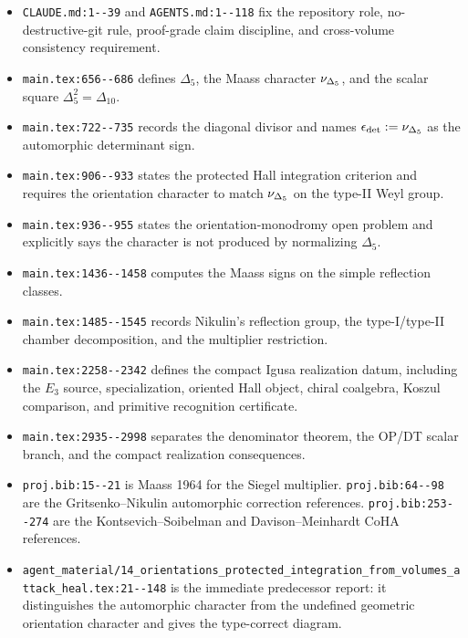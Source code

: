 \begin{itemize}
\item \verb|CLAUDE.md:1--39| and \verb|AGENTS.md:1--118| fix the
repository role, no-destructive-git rule, proof-grade claim discipline,
and cross-volume consistency requirement.

\item \verb|main.tex:656--686| defines \(\Delta_5\), the Maass character
\(\nu_{\Delta_5}\), and the scalar square \(\Delta_5^2=\Delta_{10}\).

\item \verb|main.tex:722--735| records the diagonal divisor and names
\(\epsilon_{\det}:=\nu_{\Delta_5}\) as the automorphic determinant sign.

\item \verb|main.tex:906--933| states the protected Hall integration
criterion and requires the orientation character to match \(\nu_{\Delta_5}\) on
the type-II Weyl group.

\item \verb|main.tex:936--955| states the orientation-monodromy open
problem and explicitly says the character is not produced by normalizing
\(\Delta_5\).

\item \verb|main.tex:1436--1458| computes the Maass signs on the simple
reflection classes.

\item \verb|main.tex:1485--1545| records Nikulin's reflection group,
the type-I/type-II chamber decomposition, and the multiplier restriction.

\item \verb|main.tex:2258--2342| defines the compact Igusa realization
datum, including the \(E_3\) source, specialization, oriented Hall
object, chiral coalgebra, Koszul comparison, and primitive recognition
certificate.

\item \verb|main.tex:2935--2998| separates the denominator theorem, the
OP/DT scalar branch, and the compact realization consequences.

\item \verb|proj.bib:15--21| is Maass 1964 for the Siegel multiplier.
\verb|proj.bib:64--98| are the Gritsenko--Nikulin automorphic
correction references.  \verb|proj.bib:253--274| are the
Kontsevich--Soibelman and Davison--Meinhardt CoHA references.

\item
\verb|agent_material/14_orientations_protected_integration_from_volumes_attack_heal.tex:21--148|
is the immediate predecessor report: it distinguishes the automorphic
character from the undefined geometric orientation character and gives
the type-correct diagram.


\end{itemize}
